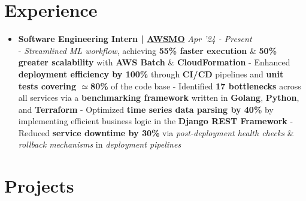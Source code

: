 \documentclass[a4paper,10pt]{extarticle} %
\begin{document}
\section{\textcolor{primary}{Experience}}
\vspace{+0.1cm}

\begin{itemize}[leftmargin=0.55cm, rightmargin=0.2cm, label={\Large\textbullet}]

\item \textbf{Software Engineering Intern | \href{https://awsmo.ai/}{AWSMO}} \hfill{\textit{Apr '24 - Present}} \\
- \textit{Streamlined ML workflow}, achieving \textbf{55\% faster execution} \& \textbf{50\% greater scalability} with \textbf{AWS Batch} \& \textbf{CloudFormation} \newline
- Enhanced \textbf{deployment efficiency by 100\%} through \textbf{CI/CD} pipelines and \textbf{unit tests covering $\simeq$80\%} of the code base \newline
- Identified \textbf{17 bottlenecks} across all services via a \textbf{benchmarking framework} written in \textbf{Golang}, \textbf{Python}, and \textbf{Terraform} \newline
- Optimized \textbf{time series data parsing by 40\%} by implementing efficient business logic in the \textbf{Django REST Framework} \newline
- Reduced \textbf{service downtime by 30\%} via \textit{post-deployment health checks} \& \textit{rollback mechanisms} in \textit{deployment pipelines}

\end{itemize}


 \vspace{0.2cm}
\section{\textcolor{primary}{Projects}}
 \vspace{0.1cm}
\end{document}
